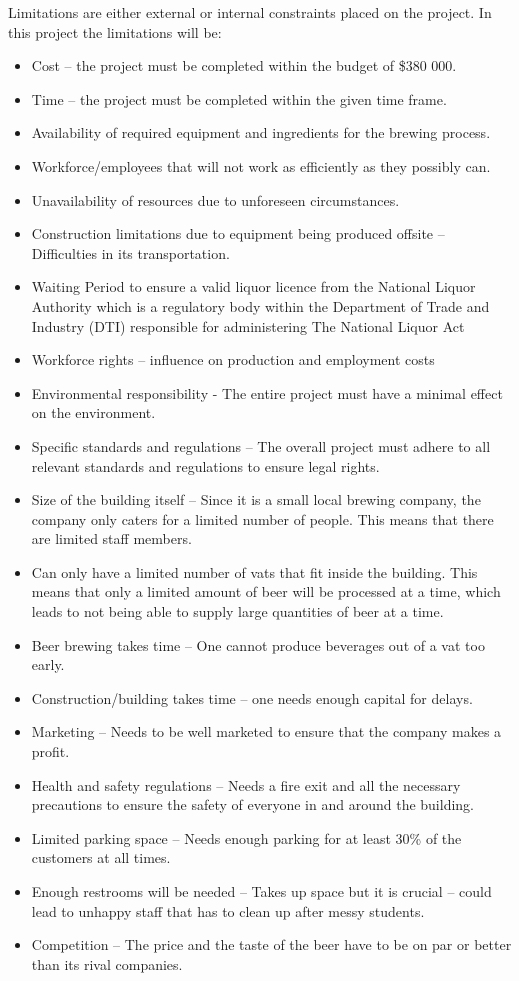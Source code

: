 Limitations are either external or internal constraints placed on the project. In this project the limitations will be:
\begin{itemize}
\item	Cost – the project must be completed within the budget of \$380 000.
\item	Time – the project must be completed within the given time frame.
\item	Availability of required equipment and ingredients for the brewing process.
\item	Workforce/employees that will not work as efficiently as they possibly can.
\item	Unavailability of resources due to unforeseen circumstances.
\item	Construction limitations due to equipment being produced offsite – Difficulties in its transportation.
\item	Waiting Period to ensure a valid liquor licence from the National Liquor Authority which is a regulatory body within the Department of Trade and Industry (DTI) responsible for administering The National Liquor Act
\item	Workforce rights – influence on production and employment costs
\item	Environmental responsibility - The entire project must have a minimal effect on the environment.
\item	Specific standards and regulations – The overall project must adhere to all relevant standards and regulations to ensure legal rights.
\item	Size of the building itself – Since it is a small local brewing company, the company only caters for a limited number of people. This means that there are limited staff members.
\item	Can only have a limited number of vats that fit inside the building. This means that only a limited amount of beer will be processed at a time, which leads to not being able to supply large quantities of beer at a time.
\item	Beer brewing takes time – One cannot produce beverages out of a vat too early.
\item	Construction/building takes time – one needs enough capital for delays.
\item	Marketing – Needs to be well marketed to ensure that the company makes a profit.
\item	Health and safety regulations – Needs a fire exit and all the necessary precautions to ensure the safety of everyone in and around the building.
\item	Limited parking space – Needs enough parking for at least 30\% of the customers at all times.
\item	Enough restrooms will be needed – Takes up space but it is crucial – could lead to unhappy staff that has to clean up after messy students.
\item	Competition – The price and the taste of the beer have to be on par or better than its rival companies.
\end{itemize}
%
%
